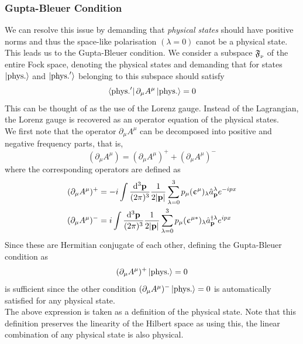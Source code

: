 \subsubsection{Gupta-Bleuer Condition}
We can resolve this issue by demanding that \textit{physical states} should have positive norms and thus the space-like polarisation $(\lambda =0)$ canot be a physical state. This leads us to the Gupta-Bleuer condition. We consider a subspace $\mathfrak{F}_{\text{\tiny p}}$ of the entire Fock space, denoting the physical states and demanding that for states $\ket{\mathrm{phys.}}$ and $\ket{\mathrm{phys.}'}$ belonging to this subspace should satisfy 
$$\bra{\mathrm{phys.}'}\partial_\mu A^\mu \ket{\mathrm{phys.}} = 0$$
This can be thought of as the use of the Lorenz gauge. Instead of the Lagrangian, the Lorenz gauge is recovered as an operator equation of the physical states. \\[0.2cm]
We first note that the operator $\partial_\mu A^\mu$ can be decomposed into positive and negative frequency parts, that is,
$$(\partial_\mu A^\mu) = (\partial_\mu A^\mu)^+ + (\partial_\mu A^\mu)^-$$
where the corresponding operators are defined as
\begin{align*}
    (\partial_\mu A^\mu)^+ &= -i \int\frac{\dd^3\vb{{\vb{p}}}}{(2\pi)^3} \frac{1}{2|\vb{p}|}\sum\limits_{\lambda = 0}^3  p_\mu (\upepsilon^\mu)_\lambda \hat{a}_{\vb{p}}^\lambda e^{-ipx} \\
(\partial_\mu A^\mu)^- &= i \int\frac{\dd^3\vb{{\vb{p}}}}{(2\pi)^3} \frac{1}{2|\vb{p}|}\sum\limits_{\lambda=0}^3 p_\mu(\upepsilon^{\mu*})_\lambda \hat{a}_{\vb{p}}^{\dagger\lambda} e^{ipx}
\end{align*}
Since these are Hermitian conjugate of each other, defining the Gupta-Bleuer condition as 
$$(\partial_\mu A^\mu)^+ \ket{\mathrm{phys}.}=0$$ is sufficient since the other condition $(\partial_\mu A^\mu)^- \ket{\mathrm{phys}.}=0$ is automatically satisfied for any physical state.\\[0.2cm]
The above expression is taken as a definition of the physical state. Note that this definition preserves the linearity of the Hilbert space as using this, the linear combination of any physical state is also physical. 
